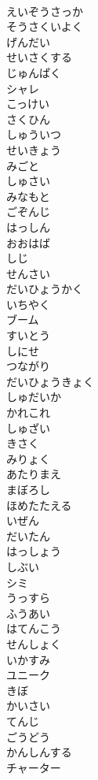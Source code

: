 \documentclass[8pt]{extreport}
\begin{document}
\begin{CJK}{UTF8}{min}
\\	えいぞうさっか
\\	そうさくいよく
\\	げんだい
\\	せいさくする
\\	じゅんぱく
\\	シャレ
\\	こっけい
\\	さくひん
\\	しゅういつ
\\	せいきょう
\\	みごと
\\	しゅさい
\\	みなもと
\\	ごぞんじ
\\	はっしん
\\	おおはば
\\	しじ
\\	せんさい
\\	だいひょうかく
\\	いちやく
\\	ブーム
\\	すいとう
\\	しにせ
\\	つながり
\\	だいひょうきょく
\\	しゅだいか
\\	かれこれ
\\	しゅざい
\\	きさく
\\	みりょく
\\	あたりまえ
\\	まぼろし
\\	ほめたたえる
\\	いぜん
\\	だいたん
\\	はっしょう
\\	しぶい
\\	シミ
\\	うっすら
\\	ふうあい
\\	はてんこう
\\	せんしょく
\\	いかすみ
\\	ユニーク
\\	きぼ
\\	かいさい
\\	てんじ
\\	ごうどう
\\	かんしんする
\\	チャーター

\end{CJK}
\end{document}
